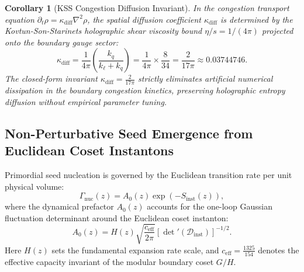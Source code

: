 \documentclass[11pt,letterpaper]{article}
\theoremstyle{plain}
\newtheorem{corollary}{Corollary}
\begin{document}
\begin{corollary}[KSS Congestion Diffusion Invariant]
In the congestion transport equation $\partial_t \rho = \kappa_{\mathrm{diff}} \nabla^2 \rho$, the spatial diffusion 
coefficient $\kappa_{\mathrm{diff}}$ is determined by the Kovtun-Son-Starinets holographic shear viscosity bound 
$\eta/s = 1/(4\pi)$ projected onto the boundary gauge sector:
\begin{equation}
    \kappa_{\mathrm{diff}} = \frac{1}{4\pi} \left(\frac{k_q}{k_\ell + k_q}\right) = \frac{1}{4\pi} \times \frac{8}{34} = \frac{2}{17\pi} \approx 0.03744746.
\end{equation}
The closed-form invariant $\kappa_{\mathrm{diff}} = \frac{2}{17\pi}$ strictly eliminates artificial numerical dissipation in the boundary congestion kinetics, preserving holographic entropy diffusion without empirical parameter tuning.
\end{corollary}


\subsection{Non-Perturbative Seed Emergence from Euclidean Coset Instantons}
\label{sec:non-perturbative-seed-emergence}

Primordial seed nucleation is governed by the Euclidean transition rate per unit physical volume:
\begin{equation}
    \Gamma_{\mathrm{nuc}}(z) = A_0(z) \exp\left( -S_{\mathrm{inst}}(z) \right),
    \label{eq:gamma_nuc_def}
\end{equation}
where the dynamical prefactor $A_0(z)$ accounts for the one-loop Gaussian fluctuation determinant around the Euclidean coset instanton:
\begin{equation}
    A_0(z) = H(z) \sqrt{\frac{c_{\mathrm{eff}}}{2\pi}} \left[ {\det}'(\mathcal{D}_{\mathrm{inst}}) \right]^{-1/2}.
    \label{eq:a0_formal}
\end{equation}
Here $H(z)$ sets the fundamental expansion rate scale, and $c_{\mathrm{eff}} = \frac{1325}{154}$ denotes the effective capacity invariant of the modular boundary coset $G/H$. 
\end{document}
